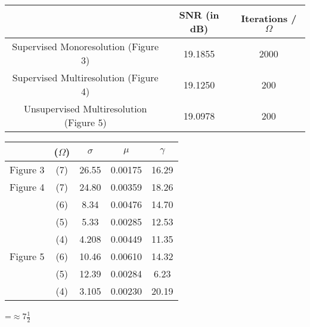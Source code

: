 {\newpage
\clearpage
\samepage \begin{table}\begin{center}
 
\begin{tabular}{|c|c|c|} \hline
& SNR (in dB) & Iterations / $\Omega$ \\  \hline \hline
Supervised Monoresolution (Figure 3) & 19.1855 & 2000 \\ 
Supervised Multiresolution (Figure 4) & 19.1250 & 200 \\ 
Unsupervised Multiresolution (Figure 5) & 19.0978 & 200 \\  \hline
\end{tabular}

\label{tab:snr}
\end{center}
 
\end{table}
}

{\newpage
\clearpage
\samepage \begin{table}\begin{center}
 
\begin{tabular}{|cc|c|c|c|} \hline 
        &($\Omega$)& $\sigma$ & $\mu$  & $\gamma$ \\  \hline \hline
Figure 3& (7)      & 26.55    &0.00175 & 16.29 \\  \hline
Figure 4& (7)& 24.80 & 0.00359& 18.26  \\  
        &(6) & 8.34 &0.00476 &14.70 \\ 
        &(5) & 5.33 &0.00285 & 12.53\\ 
        &(4) & 4.208& 0.00449&  11.35\\  \hline
Figure 5& (6)& 10.46 &0.00610& 14.32 \\ 
        &(5) & 12.39 &0.00284& 6.23\\ 
        &(4) & 3.105 &0.00230&  20.19 \\  \hline  
\end{tabular}

\label{tab:parameter}
\end{center}
 
\end{table}
}

{\newpage
\clearpage
\samepage \setbox\sizebox=\hbox{$\approx 7\frac{1}{2}$}\box\sizebox
}

{\newpage
\clearpage
\samepage {}
}

{\newpage
\clearpage
\samepage {}
}

{\newpage
\clearpage
\samepage {}
}

{\newpage
\clearpage
\samepage {}
}

{\newpage
\clearpage
\samepage {}
}




